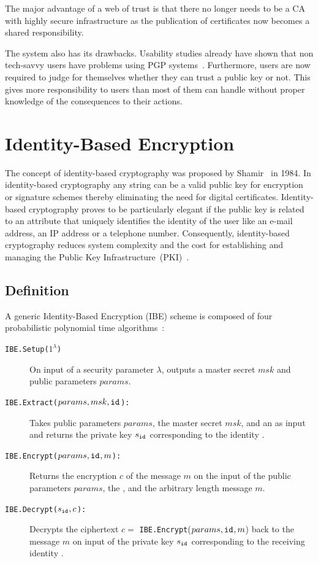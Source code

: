 The major advantage of a web of trust is that there no longer needs to be a CA with highly secure infrastructure as the publication of certificates now becomes a shared responsibility.

The system also has its drawbacks. Usability studies already have shown that non tech-savvy users have problems using PGP systems~\cite{art:WhittenT99}. Furthermore, users are now required to judge for themselves whether they can trust a public key or not. This gives more responsibility to users than most of them can handle without proper knowledge of the consequences to their actions.

\section{Identity-Based Encryption}
The concept of identity-based cryptography was proposed by Shamir~\cite{art:Shamir84} in 1984. In identity-based cryptography any string can be a valid public key for encryption or signature schemes thereby eliminating the need for digital certificates. Identity-based cryptography proves to be particularly elegant if the public key is related to an attribute that uniquely identifies the identity of the user like an e-mail address, an IP address or a telephone number. Consequently, identity-based cryptography reduces system complexity and the cost for establishing and managing the Public Key Infrastructure~(PKI)~\cite{art:BaekNSS04}. 


\subsection{Definition}
A generic Identity-Based Encryption (IBE) scheme is composed of four probabilistic polynomial time algorithms~\cite{art:BonehF01}:
\begin{description}
    \item[\texttt{IBE.Setup($1^{\lambda}$)}] On input of a security parameter $\lambda$, outputs a master secret $msk$ and public parameters $params$.
    \item[\texttt{IBE.Extract($params, msk, \mathtt{id}_{}$):}] Takes public parameters $params$, the master secret $msk$, and an \id{} as input and returns the private key $s_{\mathtt{id}_{}}$ corresponding to the identity \id{}.
    \item[\texttt{IBE.Encrypt($params, \mathtt{id}_{}, m$):}] Returns the encryption $c$ of the message $m$ on the input of the public parameters $params$, the \id{}, and the arbitrary length message $m$.
    \item[\texttt{IBE.Decrypt($s_{\mathtt{id}_{}}, c$):}] Decrypts the ciphertext $c =$ \texttt{IBE.Encrypt}($params, \mathtt{id}_{}, m$) back to the message $m$ on input of the private key $s_{\mathtt{id}_{}}$ corresponding to the receiving identity \id{}.
\end{description}

